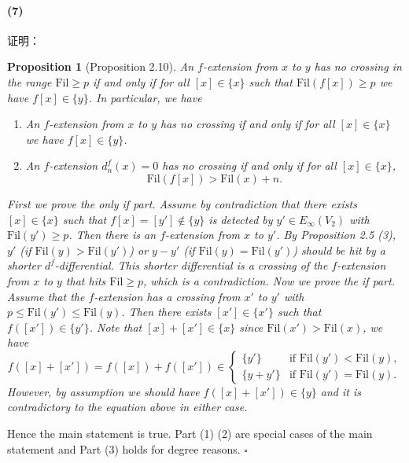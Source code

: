 \documentclass[12pt,a4paper]{article}
\renewenvironment{proof}{{\noindent\it\textbf{Proof}}\quad\it}{\hfill$\square$}
\newtheorem{prop}[equation]{Proposition}
\begin{document}
\begin{sloppy}
\paragraph{(7)}证明：

\begin{prop}[Proposition 2.10]
An $f$-extension from $x$ to $y$ has no crossing in the range $\mathrm{Fil} \geq p$ if and only if for all $[x] \in \{x\}$ such that $\mathrm{Fil}(f[x]) \geq p$ we have $f[x] \in \{y\}$. In particular, we have
\begin{enumerate}
\item[(1)] An $f$-extension from $x$ to $y$ has no crossing if and only if for all $[x] \in \{x\}$ we have $f[x] \in \{y\}$.
\item[(2)] An $f$-extension $d_n^f(x) = 0$ has no crossing if and only if for all $[x] \in \{x\}$,
$$\mathrm{Fil}(f[x]) > \mathrm{Fil}(x) + n.$$
\end{enumerate}
\end{prop}
\begin{proof}
First we prove the only if part. Assume by contradiction that there exists $[x] \in \{x\}$ such that $f[x] = [y'] \notin \{y\}$ is detected by $y' \in E_\infty(V_2)$ with $\mathrm{Fil}(y') \geq p$. Then there is an $f$-extension from $x$ to $y'$. By Proposition 2.5 (3), $y'$ (if $\mathrm{Fil}(y) > \mathrm{Fil}(y')$) or $y - y'$ (if $\mathrm{Fil}(y) = \mathrm{Fil}(y')$) should be hit by a shorter $d^f$-differential. This shorter differential is a crossing of the $f$-extension from $x$ to $y$ that hits $\mathrm{Fil} \geq p$, which is a contradiction. Now we prove the if part. Assume that the $f$-extension has a crossing from $x'$ to $y'$ with $p \leq \mathrm{Fil}(y') \leq \mathrm{Fil}(y)$. Then there exists $[x'] \in \{x'\}$ such that $f([x']) \in \{y'\}$. Note that $[x] + [x'] \in \{x\}$ since $\mathrm{Fil}(x') > \mathrm{Fil}(x)$, we have
$$f([x] + [x']) = f([x]) + f([x']) \in \begin{cases} \{y'\} & \text{if } \mathrm{Fil}(y') < \mathrm{Fil}(y), \\ \{y + y'\} & \text{if } \mathrm{Fil}(y') = \mathrm{Fil}(y). \end{cases}$$
However, by assumption we should have $f([x] + [x']) \in \{y\}$ and it is contradictory to the equation above in either case.

Hence the main statement is true. Part (1) (2) are special cases of the main statement and Part (3) holds for degree reasons.
\end{proof}


\end{sloppy}
\end{document}
